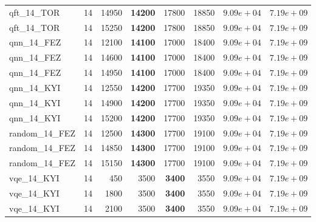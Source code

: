 \begin{table}[ht!]
\begin{tabular}{l c r r r r r r}
qft\_14\_TOR & 14 & 14950 & \textbf{14200} & 17800 & 18850 & $9.09e+04$ & $7.19e+09$ \\
qft\_14\_TOR & 14 & 15250 & \textbf{14200} & 17800 & 18850 & $9.09e+04$ & $7.19e+09$ \\
qnn\_14\_FEZ & 14 & 12100 & \textbf{14100} & 17000 & 18400 & $9.09e+04$ & $7.19e+09$ \\
qnn\_14\_FEZ & 14 & 14600 & \textbf{14100} & 17000 & 18400 & $9.09e+04$ & $7.19e+09$ \\
qnn\_14\_FEZ & 14 & 14950 & \textbf{14100} & 17000 & 18400 & $9.09e+04$ & $7.19e+09$ \\
qnn\_14\_KYI & 14 & 12550 & \textbf{14200} & 17700 & 19350 & $9.09e+04$ & $7.19e+09$ \\
qnn\_14\_KYI & 14 & 14900 & \textbf{14200} & 17700 & 19350 & $9.09e+04$ & $7.19e+09$ \\
qnn\_14\_KYI & 14 & 15200 & \textbf{14200} & 17700 & 19350 & $9.09e+04$ & $7.19e+09$ \\
random\_14\_FEZ & 14 & 12500 & \textbf{14300} & 17700 & 19100 & $9.09e+04$ & $7.19e+09$ \\
random\_14\_FEZ & 14 & 14850 & \textbf{14300} & 17700 & 19100 & $9.09e+04$ & $7.19e+09$ \\
random\_14\_FEZ & 14 & 15150 & \textbf{14300} & 17700 & 19100 & $9.09e+04$ & $7.19e+09$ \\
vqe\_14\_KYI & 14 & 450 & 3500 & \textbf{3400} & 3550 & $9.09e+04$ & $7.19e+09$ \\
vqe\_14\_KYI & 14 & 1800 & 3500 & \textbf{3400} & 3550 & $9.09e+04$ & $7.19e+09$ \\
vqe\_14\_KYI & 14 & 2100 & 3500 & \textbf{3400} & 3550 & $9.09e+04$ & $7.19e+09$ \\
\bottomrule
\end{tabular}
\end{table}